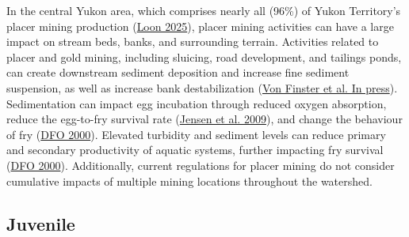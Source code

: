 \documentclass[11pt]{book}
\begin{document}
In the central Yukon area, which comprises nearly all (96\%) of Yukon Territory's placer mining production (\protect\hyperlink{ref-vanloon2025}{Loon 2025}), placer mining activities can have a large impact on stream beds, banks, and surrounding terrain. Activities related to placer and gold mining, including sluicing, road development, and tailings ponds, can create downstream sediment deposition and increase fine sediment suspension, as well as increase bank destabilization (\protect\hyperlink{ref-vonfinster}{Von Finster et al. In press}). Sedimentation can impact egg incubation through reduced oxygen absorption, reduce the egg-to-fry survival rate (\protect\hyperlink{ref-jensen2009}{Jensen et al. 2009}), and change the behaviour of fry (\protect\hyperlink{ref-dfo2000}{DFO 2000}). Elevated turbidity and sediment levels can reduce primary and secondary productivity of aquatic systems, further impacting fry survival (\protect\hyperlink{ref-dfo2000}{DFO 2000}). Additionally, current regulations for placer mining do not consider cumulative impacts of multiple mining locations throughout the watershed.

\hypertarget{juvenile}{%
\subsection{Juvenile}\label{juvenile}}
\end{document}
